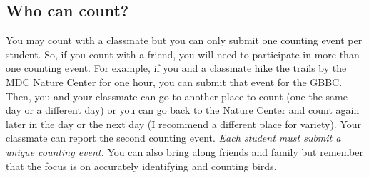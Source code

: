 \documentclass[11pt]{article}
\begin{document}
\subsection*{Who can count?}

You may count with a classmate but you can only submit one counting event per student. So, if you count with a friend, you will need to participate in more than one counting event. For example, if you and a classmate hike the trails by the MDC Nature Center for one hour,  you can submit that event for the GBBC. Then, you and your classmate can go to another place to count (one the same day or a different day) or you can go back to the Nature Center and count again later in the day or the next day (I recommend a different place for variety). Your classmate can report the second counting event.  \emph{Each student must submit a unique counting event.}  You can also bring along friends and family but remember that the focus is on accurately identifying and counting birds.
\end{document}
